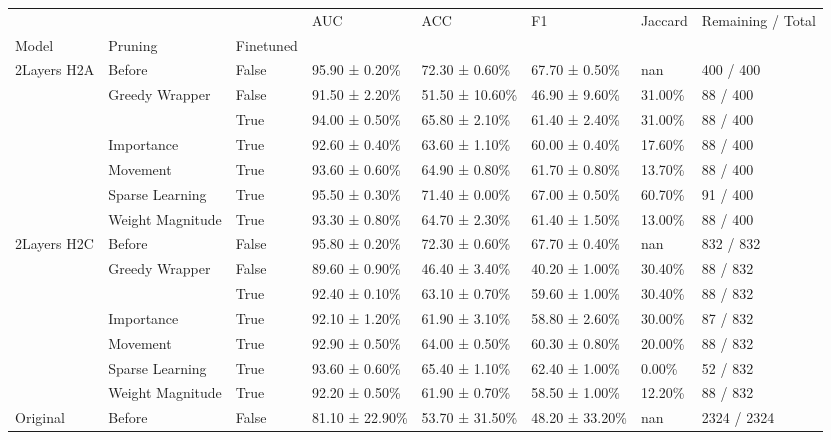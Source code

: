 \begin{tabular}{llllllll}
\toprule
 &  &  & AUC & ACC & F1 & Jaccard & Remaining / Total \\
Model & Pruning & Finetuned &  &  &  &  &  \\
\midrule
\multirow[t]{7}{*}{2Layers H2A} & Before & False & 95.90 ± 0.20\% & 72.30 ± 0.60\% & 67.70 ± 0.50\% & nan & 400 / 400 \\
\cline{2-8}
 & \multirow[t]{2}{*}{Greedy Wrapper} & False & 91.50 ± 2.20\% & 51.50 ± 10.60\% & 46.90 ± 9.60\% & 31.00\% & 88 / 400 \\
 &  & True & 94.00 ± 0.50\% & 65.80 ± 2.10\% & 61.40 ± 2.40\% & 31.00\% & 88 / 400 \\
\cline{2-8}
 & Importance & True & 92.60 ± 0.40\% & 63.60 ± 1.10\% & 60.00 ± 0.40\% & 17.60\% & 88 / 400 \\
\cline{2-8}
 & Movement & True & 93.60 ± 0.60\% & 64.90 ± 0.80\% & 61.70 ± 0.80\% & 13.70\% & 88 / 400 \\
\cline{2-8}
 & Sparse Learning & True & 95.50 ± 0.30\% & 71.40 ± 0.00\% & 67.00 ± 0.50\% & 60.70\% & 91 / 400 \\
\cline{2-8}
 & Weight Magnitude & True & 93.30 ± 0.80\% & 64.70 ± 2.30\% & 61.40 ± 1.50\% & 13.00\% & 88 / 400 \\
\cline{1-8} \cline{2-8}
\multirow[t]{7}{*}{2Layers H2C} & Before & False & 95.80 ± 0.20\% & 72.30 ± 0.60\% & 67.70 ± 0.40\% & nan & 832 / 832 \\
\cline{2-8}
 & \multirow[t]{2}{*}{Greedy Wrapper} & False & 89.60 ± 0.90\% & 46.40 ± 3.40\% & 40.20 ± 1.00\% & 30.40\% & 88 / 832 \\
 &  & True & 92.40 ± 0.10\% & 63.10 ± 0.70\% & 59.60 ± 1.00\% & 30.40\% & 88 / 832 \\
\cline{2-8}
 & Importance & True & 92.10 ± 1.20\% & 61.90 ± 3.10\% & 58.80 ± 2.60\% & 30.00\% & 87 / 832 \\
\cline{2-8}
 & Movement & True & 92.90 ± 0.50\% & 64.00 ± 0.50\% & 60.30 ± 0.80\% & 20.00\% & 88 / 832 \\
\cline{2-8}
 & Sparse Learning & True & 93.60 ± 0.60\% & 65.40 ± 1.10\% & 62.40 ± 1.00\% & 0.00\% & 52 / 832 \\
\cline{2-8}
 & Weight Magnitude & True & 92.20 ± 0.50\% & 61.90 ± 0.70\% & 58.50 ± 1.00\% & 12.20\% & 88 / 832 \\
\cline{1-8} \cline{2-8}
\multirow[t]{7}{*}{Original} & Before & False & 81.10 ± 22.90\% & 53.70 ± 31.50\% & 48.20 ± 33.20\% & nan & 2324 / 2324 \\

\end{tabular}
